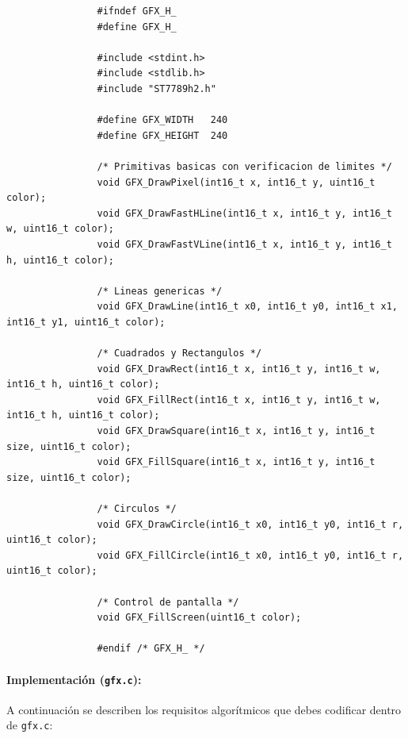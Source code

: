 \documentclass[../main.tex]{subfiles}
\begin{document}
            \begin{lstlisting}
                #ifndef GFX_H_
                #define GFX_H_

                #include <stdint.h>
                #include <stdlib.h>
                #include "ST7789h2.h"

                #define GFX_WIDTH   240
                #define GFX_HEIGHT  240

                /* Primitivas basicas con verificacion de limites */
                void GFX_DrawPixel(int16_t x, int16_t y, uint16_t color);
                void GFX_DrawFastHLine(int16_t x, int16_t y, int16_t w, uint16_t color);
                void GFX_DrawFastVLine(int16_t x, int16_t y, int16_t h, uint16_t color);

                /* Lineas genericas */
                void GFX_DrawLine(int16_t x0, int16_t y0, int16_t x1, int16_t y1, uint16_t color);

                /* Cuadrados y Rectangulos */
                void GFX_DrawRect(int16_t x, int16_t y, int16_t w, int16_t h, uint16_t color);
                void GFX_FillRect(int16_t x, int16_t y, int16_t w, int16_t h, uint16_t color);
                void GFX_DrawSquare(int16_t x, int16_t y, int16_t size, uint16_t color);
                void GFX_FillSquare(int16_t x, int16_t y, int16_t size, uint16_t color);

                /* Circulos */
                void GFX_DrawCircle(int16_t x0, int16_t y0, int16_t r, uint16_t color);
                void GFX_FillCircle(int16_t x0, int16_t y0, int16_t r, uint16_t color);

                /* Control de pantalla */
                void GFX_FillScreen(uint16_t color);

                #endif /* GFX_H_ */
            \end{lstlisting}

            \paragraph{Implementación (\texttt{gfx.c}):}
            A continuación se describen los requisitos algorítmicos que debes codificar dentro de \texttt{gfx.c}:
\end{document}
